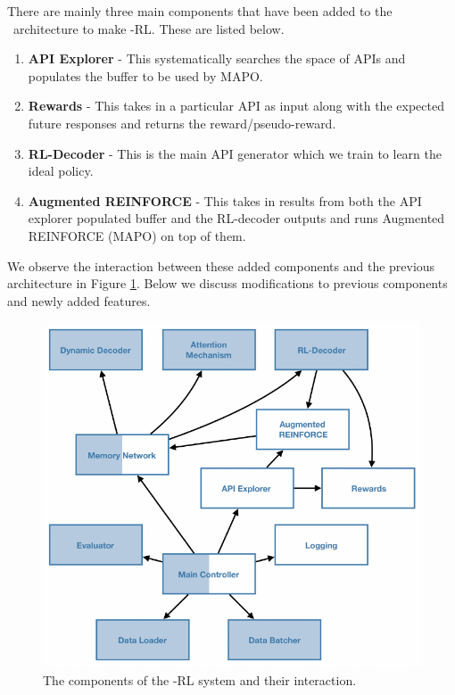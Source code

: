 There are mainly three main components that have been added to the \sys\ architecture to make \sys -RL. These are listed below.

\begin{enumerate}
	\item \textbf{API Explorer} - This systematically searches the space of APIs and populates the buffer to be used by MAPO.
	\item \textbf{Rewards} - This takes in a particular API as input along with the expected future responses and returns the reward/pseudo-reward.
	\item \textbf{RL-Decoder} - This is the main API generator which we train to learn the ideal policy.
	\item \textbf{Augmented REINFORCE} - This takes in results from both the API explorer populated buffer and the RL-decoder outputs and runs Augmented REINFORCE (MAPO) on top of them.
\end{enumerate}

We observe the interaction between these added components and the previous architecture in Figure \ref{fig:sys_comp_rl}. Below we discuss modifications to previous components and newly added features.

\begin{figure}[t]
\centering
\includegraphics[scale=1.2]{assets/figures/rl_components.pdf}
\caption{The components of the \sys -RL system and their interaction.}
\label{fig:sys_comp_rl}
\end{figure}

